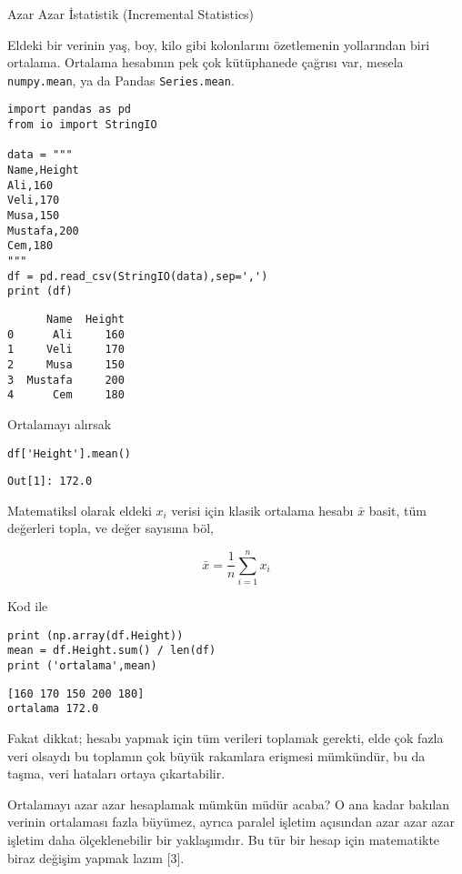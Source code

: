 \documentclass[12pt,fleqn]{article}\usepackage{../../common}
\begin{document}
Azar Azar İstatistik (Incremental Statistics)

Eldeki bir verinin yaş, boy, kilo gibi kolonlarını özetlemenin yollarından biri
ortalama. Ortalama hesabının pek çok kütüphanede çağrısı var, mesela
\verb!numpy.mean!, ya da Pandas \verb!Series.mean!.


\begin{verbatim}
import pandas as pd
from io import StringIO

data = """
Name,Height
Ali,160
Veli,170
Musa,150
Mustafa,200
Cem,180
"""
df = pd.read_csv(StringIO(data),sep=',')
print (df)
\end{verbatim}

\begin{verbatim}
      Name  Height
0      Ali     160
1     Veli     170
2     Musa     150
3  Mustafa     200
4      Cem     180
\end{verbatim}

Ortalamayı alırsak

\begin{verbatim}
df['Height'].mean()
\end{verbatim}

\begin{verbatim}
Out[1]: 172.0
\end{verbatim}

Matematiksl olarak eldeki $x_i$ verisi için klasik ortalama hesabı $\bar{x}$
basit, tüm değerleri topla, ve değer sayısına böl,

$$
\bar{x} = \frac{1}{n} \sum _{i=1}^{n} x_i
$$

Kod ile

\begin{verbatim}
print (np.array(df.Height))
mean = df.Height.sum() / len(df)
print ('ortalama',mean)
\end{verbatim}

\begin{verbatim}
[160 170 150 200 180]
ortalama 172.0
\end{verbatim}

Fakat dikkat; hesabı yapmak için tüm verileri toplamak gerekti, elde çok fazla
veri olsaydı bu toplamın çok büyük rakamlara erişmesi mümkündür, bu da taşma,
veri hataları ortaya çıkartabilir.

Ortalamayı azar azar hesaplamak mümkün müdür acaba? O ana kadar bakılan verinin
ortalaması fazla büyümez, ayrıca paralel işletim açısından azar azar azar
işletim daha ölçeklenebilir bir yaklaşımdır. Bu tür bir hesap için matematikte
biraz değişim yapmak lazım [3].
\end{document}
